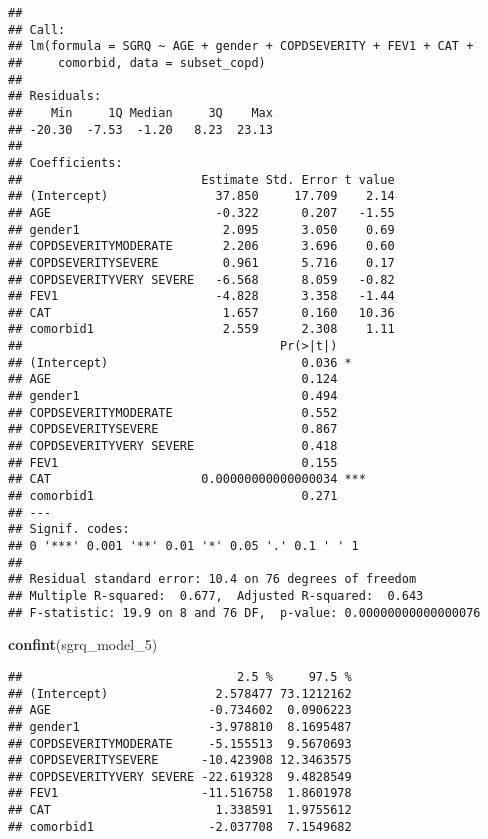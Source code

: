 \documentclass[
]{article}
\newenvironment{Shaded}{\begin{snugshade}}{\end{snugshade}}
\newcommand{\FunctionTok}[1]{\textcolor[rgb]{0.13,0.29,0.53}{\textbf{#1}}}
\newcommand{\NormalTok}[1]{#1}
\begin{document}
\begin{verbatim}
## 
## Call:
## lm(formula = SGRQ ~ AGE + gender + COPDSEVERITY + FEV1 + CAT + 
##     comorbid, data = subset_copd)
## 
## Residuals:
##    Min     1Q Median     3Q    Max 
## -20.30  -7.53  -1.20   8.23  23.13 
## 
## Coefficients:
##                         Estimate Std. Error t value
## (Intercept)               37.850     17.709    2.14
## AGE                       -0.322      0.207   -1.55
## gender1                    2.095      3.050    0.69
## COPDSEVERITYMODERATE       2.206      3.696    0.60
## COPDSEVERITYSEVERE         0.961      5.716    0.17
## COPDSEVERITYVERY SEVERE   -6.568      8.059   -0.82
## FEV1                      -4.828      3.358   -1.44
## CAT                        1.657      0.160   10.36
## comorbid1                  2.559      2.308    1.11
##                                    Pr(>|t|)    
## (Intercept)                           0.036 *  
## AGE                                   0.124    
## gender1                               0.494    
## COPDSEVERITYMODERATE                  0.552    
## COPDSEVERITYSEVERE                    0.867    
## COPDSEVERITYVERY SEVERE               0.418    
## FEV1                                  0.155    
## CAT                     0.00000000000000034 ***
## comorbid1                             0.271    
## ---
## Signif. codes:  
## 0 '***' 0.001 '**' 0.01 '*' 0.05 '.' 0.1 ' ' 1
## 
## Residual standard error: 10.4 on 76 degrees of freedom
## Multiple R-squared:  0.677,  Adjusted R-squared:  0.643 
## F-statistic: 19.9 on 8 and 76 DF,  p-value: 0.00000000000000076
\end{verbatim}

\begin{Shaded}
\begin{Highlighting}[]
\FunctionTok{confint}\NormalTok{(sgrq\_model\_5)}
\end{Highlighting}
\end{Shaded}

\begin{verbatim}
##                              2.5 %     97.5 %
## (Intercept)               2.578477 73.1212162
## AGE                      -0.734602  0.0906223
## gender1                  -3.978810  8.1695487
## COPDSEVERITYMODERATE     -5.155513  9.5670693
## COPDSEVERITYSEVERE      -10.423908 12.3463575
## COPDSEVERITYVERY SEVERE -22.619328  9.4828549
## FEV1                    -11.516758  1.8601978
## CAT                       1.338591  1.9755612
## comorbid1                -2.037708  7.1549682
\end{verbatim}
\end{document}
